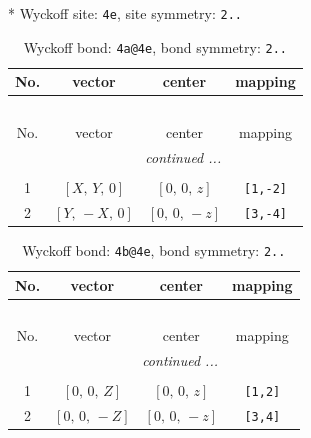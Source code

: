 \documentclass[fleqn,8pt]{jsarticle}
\begin{document}
* Wyckoff site: {\tt 4e}, site symmetry: {\tt 2..}
\renewcommand{\arraystretch}{1.2}
\begin{longtable}{cccc}
\caption{Wyckoff bond: {\tt 4a@4e}, bond symmetry: {\tt 2..}}
 \\
 \hline \hline
No. & vector & center & mapping \\ \hline \endfirsthead

\multicolumn{3}{l}{\tablename\ \thetable{}} \\
 \hline \hline
No. & vector & center & mapping \\ \hline \endhead

 \hline \hline
\multicolumn{3}{r}{\footnotesize\it continued ...} \\ \endfoot

 \hline \hline
\multicolumn{3}{r}{} \\ \endlastfoot

1 & $\left[ X,\, Y,\, 0 \right]$ & $\left[ 0,\, 0,\, z \right]$ & {\tt [1,-2]} \\ \hline
2 & $\left[ Y,\, - X,\, 0 \right]$ & $\left[ 0,\, 0,\, - z \right]$ & {\tt [3,-4]} \\
\end{longtable}
\renewcommand{\arraystretch}{1.2}
\begin{longtable}{cccc}
\caption{Wyckoff bond: {\tt 4b@4e}, bond symmetry: {\tt 2..}}
 \\
 \hline \hline
No. & vector & center & mapping \\ \hline \endfirsthead

\multicolumn{3}{l}{\tablename\ \thetable{}} \\
 \hline \hline
No. & vector & center & mapping \\ \hline \endhead

 \hline \hline
\multicolumn{3}{r}{\footnotesize\it continued ...} \\ \endfoot

 \hline \hline
\multicolumn{3}{r}{} \\ \endlastfoot

1 & $\left[ 0,\, 0,\, Z \right]$ & $\left[ 0,\, 0,\, z \right]$ & {\tt [1,2]} \\ \hline
2 & $\left[ 0,\, 0,\, - Z \right]$ & $\left[ 0,\, 0,\, - z \right]$ & {\tt [3,4]} \\
\end{longtable}
\renewcommand{\arraystretch}{1.2}
\end{document}
